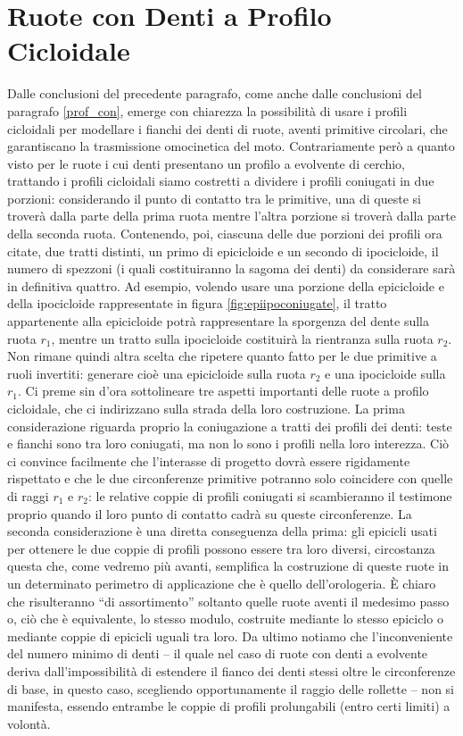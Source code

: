 \section{Ruote con Denti a Profilo Cicloidale}

\noindent Dalle conclusioni del precedente paragrafo, come anche dalle
conclusioni del paragrafo \ref{prof_con}, emerge con chiarezza la possibilit\`a
di usare i profili cicloidali per modellare i fianchi dei denti di ruote,
aventi primitive circolari,
che garantiscano la trasmissione omocinetica del moto. Contrariamente 
per\`o a quanto visto per le ruote i cui denti presentano un
profilo a evolvente di cerchio,
trattando i profili cicloidali siamo costretti a dividere i profili coniugati
in due porzioni: considerando il punto di contatto tra le
primitive, una di queste si trover\`a 
dalla parte della prima ruota mentre l'altra porzione si trover\`a
dalla parte della seconda ruota. Contenendo, poi, ciascuna delle due porzioni
dei profili ora citate, due tratti distinti, un primo di epicicloide
e un secondo di ipocicloide,
il numero di spezzoni (i quali costituiranno la sagoma dei denti) da considerare sar\`a in definitiva quattro.
Ad esempio, volendo
usare una porzione della epicicloide e della ipocicloide rappresentate in
 figura \ref{fig:epiipoconiugate}, il tratto appartenente alla epicicloide
potr\`a rappresentare la sporgenza del dente sulla ruota $r_1$, 
 mentre un tratto sulla ipocicloide
costituir\`a la rientranza sulla ruota $r_2$.
Non rimane quindi altra scelta che
ripetere quanto fatto per le due primitive a ruoli invertiti: generare cio\`e
una epicicloide sulla ruota $r_2$
e una ipocicloide sulla $r_1$. Ci preme sin d'ora sottolineare
tre aspetti importanti delle ruote a profilo cicloidale,
che ci indirizzano sulla strada della loro costruzione.
La prima considerazione riguarda proprio la coniugazione
a tratti dei profili dei denti:
teste e fianchi sono tra loro coniugati, ma non lo sono i profili
nella loro interezza.
Ci\`o ci convince facilmente che l'interasse di progetto
dovr\`a essere rigidamente rispettato e che le due circonferenze primitive
potranno solo coincidere con quelle di raggi
$r_1$ e $r_2$: le relative coppie di profili coniugati si scambieranno
il testimone proprio quando il loro punto di contatto cadr\`a su queste
circonferenze.
La seconda considerazione \`e una diretta conseguenza della
prima: gli epicicli usati per ottenere le due coppie di profili possono essere
tra loro diversi, circostanza questa
che, come vedremo pi\`u avanti, semplifica la
 costruzione di queste ruote in un determinato perimetro di applicazione che
\`e quello dell'orologeria.
\`E chiaro che risulteranno ``di assortimento'' soltanto quelle ruote
aventi il medesimo passo o, ci\`o che \`e equivalente, lo stesso modulo, 
costruite mediante lo stesso epiciclo o mediante coppie di epicicli uguali
tra loro.
Da ultimo notiamo che l'inconveniente del numero minimo di
denti -- il quale
nel caso di ruote con denti a evolvente deriva dall'impossibilit\`a
di
estendere il fianco dei denti stessi oltre le circonferenze di base,
in questo caso, scegliendo opportunamente il raggio delle rollette --
non si manifesta, essendo entrambe le coppie di profili
prolungabili (entro certi limiti) a volont\`a.

